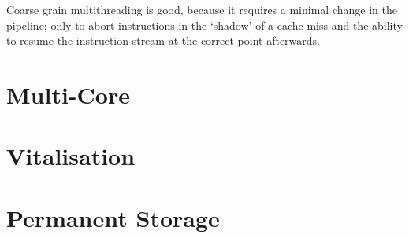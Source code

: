 Coarse grain multithreading is good, because it requires a minimal change in the
pipeline; only to abort instructions in the `shadow' of a cache miss and the
ability to resume the instruction stream at the correct point afterwards.


\section{Multi-Core}

\section{Vitalisation}

\section{Permanent Storage}
